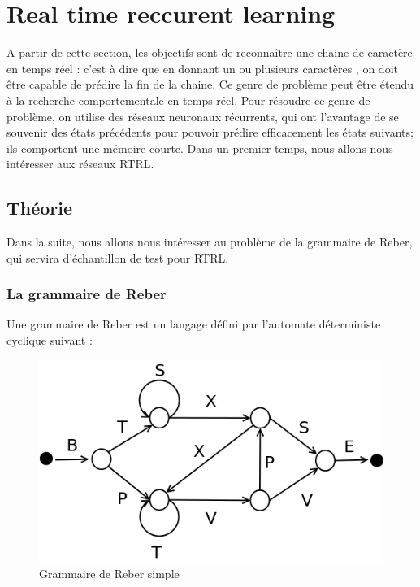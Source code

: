 
\chapter{Real time reccurent learning}

A partir de cette section, les objectifs sont de reconnaître une chaine de caractère en temps réel : c'est à dire que en donnant un ou plusieurs caractères , on doit être capable de prédire la fin de la chaine.
Ce genre de problème peut être étendu à la recherche comportementale en temps réel.
Pour résoudre ce genre de problème, on utilise des réseaux neuronaux récurrents, qui ont l'avantage de se souvenir des états précédents pour pouvoir prédire efficacement les états suivants; ils comportent une mémoire courte.
Dans un premier temps, nous allons nous intéresser aux réseaux RTRL.

\section{Théorie}

Dans la suite, nous allons nous intéresser au problème de la grammaire de Reber, qui servira d'échantillon de test pour RTRL.

\subsection{La grammaire de Reber}

Une grammaire de Reber est un langage défini par l'automate déterministe cyclique suivant :

\begin{figure}[!ht]
\begin{center}
\includegraphics[scale=0.4]{images/reberGrammar.png}
\end{center}
\caption{Grammaire de Reber simple}
\end{figure}


